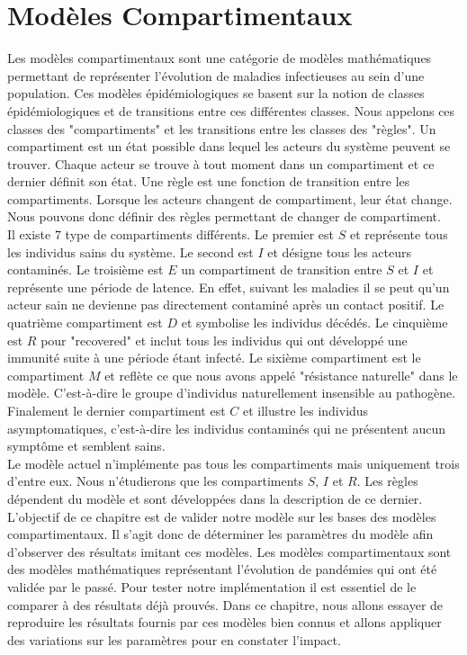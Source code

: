 \chapter{Modèles Compartimentaux} \label{ch:intro}

Les modèles compartimentaux sont une catégorie de modèles mathématiques permettant de représenter l'évolution de maladies infectieuses au sein d'une population. Ces modèles épidémiologiques se basent sur la notion de classes épidémiologiques et de transitions entre ces différentes classes. Nous appelons ces classes des "compartiments" et les transitions entre les classes des "règles". Un compartiment est un état possible dans lequel les acteurs du système peuvent se trouver. Chaque acteur se trouve à tout moment dans un compartiment et ce dernier définit son état. Une règle est une fonction de transition entre les compartiments. Lorsque les acteurs changent de compartiment, leur état change. Nous pouvons donc définir des règles permettant de changer de compartiment.\\

Il existe $7$ type de compartiments différents. Le premier est $S$ et représente tous les individus sains du système. Le second est $I$ et désigne tous les acteurs contaminés. Le troisième est $E$ un compartiment de transition entre $S$ et $I$ et représente une période de latence. En effet, suivant les maladies il se peut qu'un acteur sain ne devienne pas directement contaminé après un contact positif. Le quatrième compartiment est $D$ et symbolise les individus décédés. Le cinquième est $R$ pour "recovered" et inclut tous les individus qui ont développé une immunité suite à une période étant infecté. Le sixième compartiment est le compartiment $M$ et reflète ce que nous avons appelé "résistance naturelle" dans le modèle. C'est-à-dire le groupe d'individus naturellement insensible au pathogène. Finalement le dernier compartiment est $C$ et illustre les individus asymptomatiques, c'est-à-dire les individus contaminés qui ne présentent aucun symptôme et semblent sains.\\

Le modèle actuel n'implémente pas tous les compartiments mais uniquement trois d'entre eux. Nous n'étudierons que les compartiments $S$, $I$ et $R$. Les règles dépendent du modèle et sont développées dans la description de ce dernier.\\

L'objectif de ce chapitre est de valider notre modèle sur les bases des modèles compartimentaux. Il s'agit donc de déterminer les paramètres du modèle afin d'observer des résultats imitant ces modèles. Les modèles compartimentaux sont des modèles mathématiques représentant l'évolution de pandémies qui ont été validée par le passé. Pour tester notre implémentation il est essentiel de le comparer à des résultats déjà prouvés. Dans ce chapitre, nous allons essayer de reproduire les résultats fournis par ces modèles bien connus et allons appliquer des variations sur les paramètres pour en constater l'impact.\\

